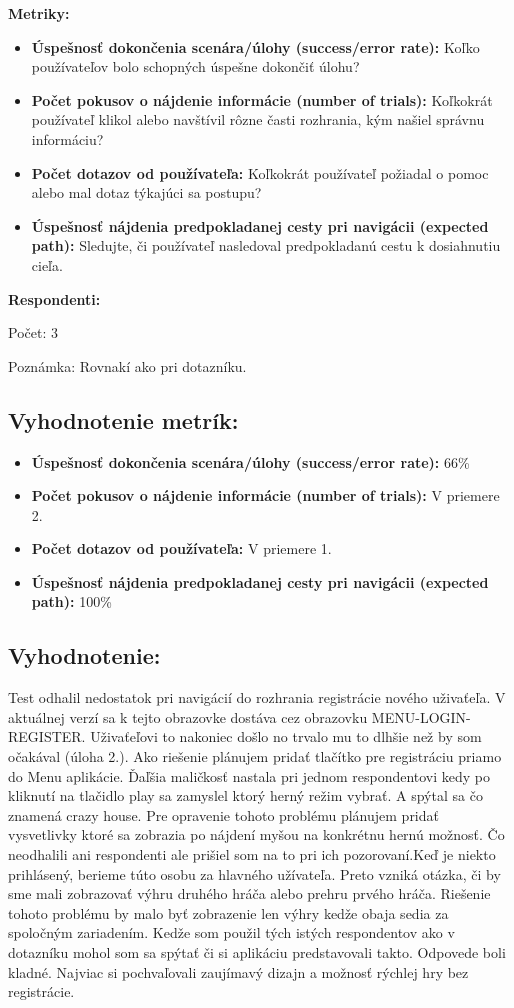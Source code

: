 \documentclass[a4paper, 11pt, onecolumn]{article}
\begin{document}
\textbf{Metriky:}
\begin{itemize}
    \item \textbf{Úspešnosť dokončenia scenára/úlohy (success/error rate):} Koľko používateľov bolo schopných úspešne dokončiť úlohu?
    \item \textbf{Počet pokusov o nájdenie informácie (number of trials):} Koľkokrát používateľ klikol alebo navštívil rôzne časti rozhrania, kým našiel správnu informáciu?
    \item \textbf{Počet dotazov od používateľa:} Koľkokrát používateľ požiadal o pomoc alebo mal dotaz týkajúci sa postupu?
    \item \textbf{Úspešnosť nájdenia predpokladanej cesty pri navigácii (expected path):} Sledujte, či používateľ nasledoval predpokladanú cestu k dosiahnutiu cieľa.
\end{itemize}

\textbf{Respondenti:}

Počet: 3 

Poznámka: Rovnakí ako pri dotazníku.

\subsection*{Vyhodnotenie metrík:}
\begin{itemize}
    \item \textbf{Úspešnosť dokončenia scenára/úlohy (success/error rate):} 66\%
    \item \textbf{Počet pokusov o nájdenie informácie (number of trials):} V priemere 2.
    \item \textbf{Počet dotazov od používateľa:} V priemere 1.
    \item \textbf{Úspešnosť nájdenia predpokladanej cesty pri navigácii (expected path):} 100\%
\end{itemize}

\subsection*{Vyhodnotenie:}
Test odhalil nedostatok pri navigácií do rozhrania registrácie nového uživaťeľa. V aktuálnej verzí sa k tejto obrazovke dostáva cez obrazovku MENU-LOGIN-REGISTER.
Uživaťeľovi to nakoniec došlo no trvalo mu to dlhšie než by som očakával (úloha 2.). Ako riešenie plánujem pridať tlačítko pre registráciu priamo do Menu aplikácie.
Ďaľšia maličkosť nastala pri jednom respondentovi kedy po kliknutí na tlačidlo play sa zamyslel ktorý herný režim vybrať.
A spýtal sa čo znamená crazy house. Pre opravenie tohoto problému plánujem pridať vysvetlivky ktoré sa  zobrazia po nájdení myšou na konkrétnu hernú možnosť.
Čo neodhalili ani respondenti ale prišiel som na to pri ich pozorovaní.Keď je niekto prihlásený, berieme túto osobu za hlavného užívateľa. Preto vzniká otázka,
či by sme mali zobrazovať výhru druhého hráča alebo prehru prvého hráča.
Riešenie tohoto problému by malo byť zobrazenie  len výhry kedže obaja sedia za spoločným zariadením.
Kedže som použil tých istých respondentov ako v dotazníku mohol som sa spýtať či si aplikáciu predstavovali takto.
Odpovede boli kladné. Najviac si pochvaľovali zaujímavý dizajn a možnosť rýchlej hry bez registrácie.
\end{document}
